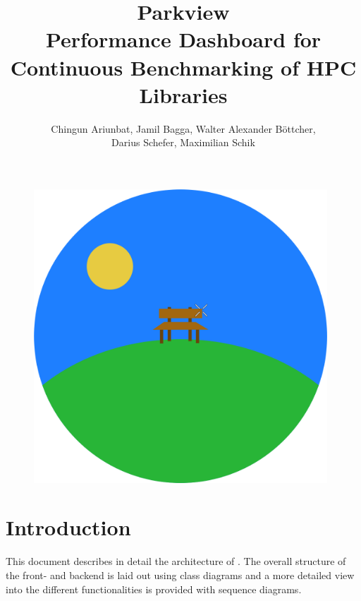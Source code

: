 \documentclass[parskip=full,11pt]{scrartcl}
\title{\Huge Parkview\\
    \LARGE \normalfont Performance Dashboard for Continuous Benchmarking of HPC Libraries}
\author{Chingun Ariunbat, Jamil Bagga, Walter Alexander B\"ottcher,\\Darius Schefer, Maximilian Schik}
\begin{document}
\maketitle
\begin{figure}[h]
	\includegraphics[width=11cm]{parkview.png}
	\centering
\end{figure}

\thispagestyle{empty}

\clearpage
{}

\tableofcontents
\clearpage

\section{Introduction}
This \gls{document} describes in detail the architecture of \parkview{}. The overall structure of the front- and backend is laid out using class diagrams and a more detailed view into the different functionalities is provided with sequence diagrams.
\clearpage


\clearpage


\clearpage


\clearpage


\clearpage


\appendix


\clearpage

\printnoidxglossaries
\end{document}
